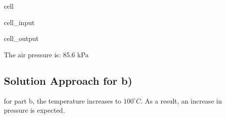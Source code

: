 \documentclass[letterpaper,10pt,english]{jupyterBook}
\begin{document}
\begin{sphinxuseclass}{cell}\begin{sphinxVerbatimInput}

\begin{sphinxuseclass}{cell_input}
\begin{sphinxVerbatim}[commandchars=\\\{\}]
   
   
   
     

         

  
\end{sphinxVerbatim}

\end{sphinxuseclass}\end{sphinxVerbatimInput}
\begin{sphinxVerbatimOutput}

\begin{sphinxuseclass}{cell_output}
\begin{sphinxVerbatim}[commandchars=\\\{\}]
The air pressure is: 85.6 kPa
\end{sphinxVerbatim}

\end{sphinxuseclass}\end{sphinxVerbatimOutput}

\end{sphinxuseclass}

\subsection{Solution Approach for b)}
\label{\detokenize{notebooks/Chapter3/CH3-Q1_v1:solution-approach-for-b}}
\sphinxAtStartPar
for part b, the temperature increases to \(100 ^{\circ} C\). As a result, an increase in pressure is expected.
\end{document}
